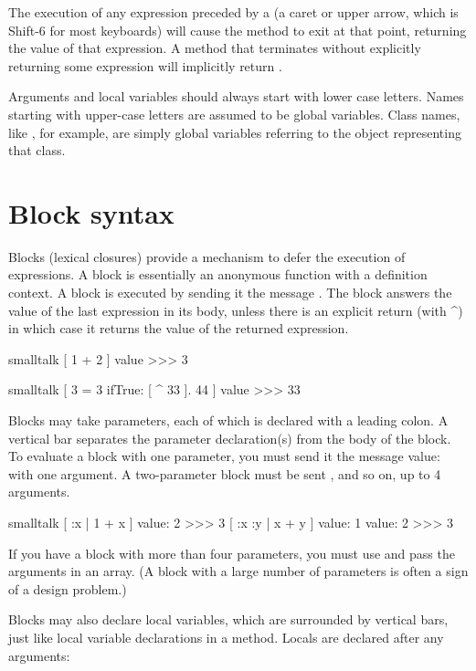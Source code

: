 \documentclass[10pt,twoside,english]{_support/latex/sbabook/sbabook}
\begin{document}
The execution of any expression preceded by a \textcode{\string^} (a caret or upper
arrow, which is Shift-6 for most keyboards) will cause the method to exit at
that point, returning the value of that expression. A method that terminates
without explicitly returning some expression will implicitly return .

Arguments and local variables should always start with lower case letters. Names
starting with upper-case letters are assumed to be global variables. Class
names, like , for example, are simply global variables referring to
the object representing that class.
\section{Block syntax}
Blocks (lexical closures) provide a mechanism to defer the execution of expressions. A block is
essentially an anonymous function with a definition context. A block is executed by sending it the
message . The block answers the value of the last expression in its
body, unless there is an explicit return (with \string^) in which case it returns the value of the returned expression.

\begin{displaycode}{smalltalk}
[ 1 + 2 ] value 
>>> 3
\end{displaycode}

\begin{displaycode}{smalltalk}
[ 3 = 3 ifTrue: [ ^ 33 ]. 44 ] value
>>> 33
\end{displaycode}

Blocks may take parameters, each of which is declared with a leading colon. A
vertical bar separates the parameter declaration(s) from the body of the block.
To evaluate a block with one parameter, you must send it the message value: with
one argument. A two-parameter block must be sent , and so on, up
to 4 arguments.

\begin{displaycode}{smalltalk}
[ :x | 1 + x ] value: 2 
>>> 3
[ :x :y | x + y ] value: 1 value: 2 
>>> 3
\end{displaycode}

If you have a block with more than four parameters, you must use
 and pass the arguments in an array. (A block with a
large number of parameters is often a sign of a design problem.)

Blocks may also declare local variables, which are surrounded by vertical bars,
just like local variable declarations in a method. Locals are declared after any
arguments:
\end{document}
